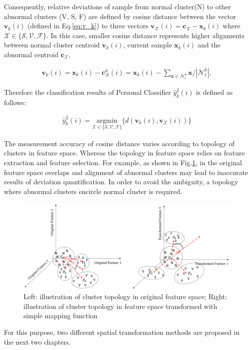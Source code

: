 Consequently, relative deviations of sample from normal cluster(N) to other abnormal clusters (V, S, F) are defined by cosine distance between the vector $\mathbf{v}_k(i)$ (defined in Eq.\ref{eq:v_k}) to three vectors $\mathbf{v}_{\mathcal{X}}(i)=\mathbf{c}_{\mathcal{X}}-\mathbf{x}_k(i)$ where $\mathcal{X} \in \{ \mathcal{S}, \mathcal{V}, \mathcal{F}\}$. In this case, smaller cosine distance represents higher alignments between normal cluster centroid $\mathbf{v}_k(i)$, current sample $\mathbf{x}_k(i)$ and the abnormal centroid $\mathbf{c}_{\mathcal{X}}$.


\begin{align}
\label{eq:v_k}
\mathbf{v}_k(i)=\mathbf{x}_k(i)-\mathbf{c}_N^k(i) = \mathbf{x}_k(i)- {\sum_{\mathbf{x} \in \mathcal{N}_i^k} \mathbf{x}}/{|\mathcal{N}_i^k|}, 
\end{align}

Therefore the classification results of Personal Classifier $\hat{y}^2_k(i)$ is defined as follows:

\begin{align}
\label{eq:personal_discrim}
\hat{y}^2_k(i) = \underset{\mathcal{X} \in \{ \mathcal{S}, \mathcal{V}, \mathcal{F} \}}{\text{argmin}}\{ d(\mathbf{v}_k(i),\mathbf{v}_{\mathcal{X}}(i)) \} 
\end{align}

The measurement accuracy of cosine distance varies according to topology of clusters in feature space. Whereas the topology in feature space relies on feature extraction and feature selection. For example, as shown in Fig.\ref{fig:topo1}, in the original feature space overlaps and alignment of abnormal clusters may lead to inaccurate results of deviation quantification. In order to avoid the ambiguity, a topology where abnormal clusters encircle normal cluster is required.

\begin{figure}[thpb]
\centering
\includegraphics[scale=.5]{Fig/topo1.png}
\caption{Left: illustration of cluster topology in original feature space; Right: illustration of cluster topology in feature space transformed with simple mapping function}
\label{fig:topo1}
\end{figure}

For this purpose, two different spatial transformation methods are proposed in the next two chapters.